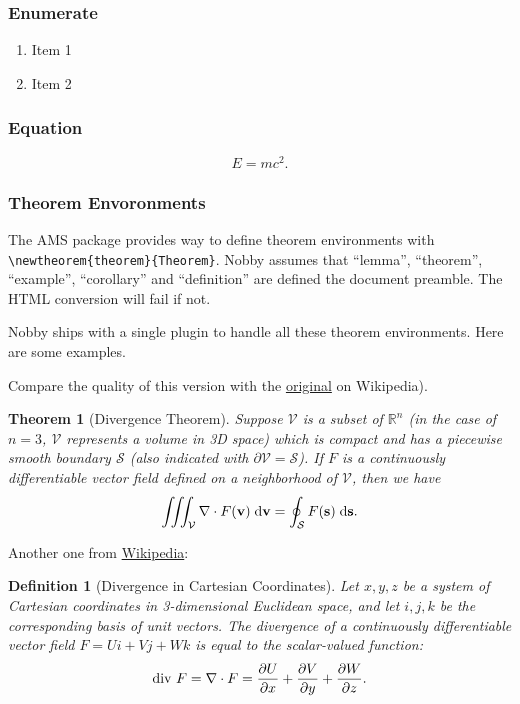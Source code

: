 \documentclass[10pt]{article}
\newtheorem{theorem}{Theorem}
\newtheorem{definition}{Definition}
\newcommand{\mvec}[1]{\mathbf{#1}}
\begin{document}
\subsubsection{Enumerate}
\begin{enumerate}
\item Item 1
\item Item 2
\end{enumerate}

\subsubsection{Equation}
\begin{equation}
  \label{eq:rel}
  E = mc^2.
\end{equation}

\subsubsection{Theorem Envoronments}
The AMS package provides way to define theorem environments with
\texttt{\textbackslash{newtheorem\{theorem\}\{Theorem\}}}. Nobby
assumes that ``lemma'', ``theorem'', ``example'', ``corollary'' and
``definition'' are defined the document preamble. The HTML conversion
will fail if not.

Nobby ships with a single plugin to handle all these theorem
environments. Here are some examples.

Compare the quality of this version with the 
\href{http://en.wikipedia.org/wiki/Divergence_theorem}{original} on
Wikipedia).
\begin{theorem}[Divergence Theorem]
  \label{thm:div}
  Suppose $\mathcal{V}$ is a subset of $\mathbb{R}^n$ (in the case of
  $n=3$, $\mathcal{V}$ represents a volume in 3D space) which is
  compact and has a piecewise smooth boundary $\mathcal{S}$ (also
  indicated with $\partial\mathcal{V} = \mathcal{S}$). If $F$ is a
  continuously differentiable vector field defined on a neighborhood
  of $\mathcal{V}$, then we have
  \begin{align}
    \iiint_{\mathcal{V}} \nabla \cdot F(\mvec{v})\; \textnormal{d}\mvec{v}
    = \oint_{\mathcal{S}} F(\mvec{s})\; \textnormal{d}\mvec{s}.
  \end{align}
\end{theorem}

Another one from \href{http://en.wikipedia.org/wiki/Divergence}{Wikipedia}:
\begin{definition}[Divergence in Cartesian Coordinates]
  \label{def:div}
  Let $x, y, z$ be a system of Cartesian coordinates in 3-dimensional
  Euclidean space, and let $i, j, k$ be the corresponding basis of unit
  vectors. The divergence of a continuously differentiable vector
  field $F = U i + V j + W k$ is equal to the scalar-valued function:
  \begin{align}
    \textnormal{div } F = \nabla \cdot F = 
    \frac{\partial U}{\partial x} +
    \frac{\partial V}{\partial y} +
    \frac{\partial W}{\partial z}.
  \end{align}
\end{definition}
\end{document}
